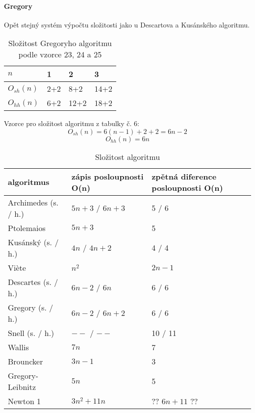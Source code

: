 \documentclass[rocnikovka]{gzwroc} %
\begin{document}
\paragraph{Gregory}
Opět stejný systém výpočtu složitosti jako u Descartova a  Kusánského algoritmu.
\begin{table}[h!]
\caption{Složitost Gregoryho algoritmu podle vzorce 23, 24 a 25}
\begin{tabular}{|l||l|l|l|}
\hline
$n$ & 1&2&3 \\ \hline
$O_{sh}(n)$&2+2&8+2&14+2 \\ \hline
$O_{hh}(n)$&6+2&12+2&18+2 \\ \hline
\end{tabular}
\end{table}
Vzorce pro složitost algoritmu z tabulky č. 6:
$$
O_{sh}(n)=6(n-1)+2+2=6n-2
$$
$$
O_{hh}(n)=6n
$$


\begin{table}[h!]
\caption{Složitost algoritmu}
\begin{tabular}{|l||l|l|}
\hline
\bfseries{algoritmus} & \bfseries{zápis posloupnosti O(n)} & \bfseries{zpětná diference posloupnosti O(n)} \\ \hline \hline
Archimedes (s. / h.) & $5n+3$ / $6n+3$      & 5 / 6   \\ \hline
Ptolemaios & $5n+3$      & 5   \\ \hline
Kusánský (s. / h.) & $4n$ / $4n+2$      & 4 / 4   \\ \hline  
Viète & $n^2$      & $2n-1$   \\ \hline
Descartes (s. / h.) & $6n-2$ / $6n$      & 6 / 6   \\ \hline
Gregory (s. / h.) & $6n-2$ / $6n+2$      & 6 / 6   \\ \hline
Snell (s. / h.) & $--$ / $--$      & 10 / 11   \\ \hline
Wallis & $7n$    & 7   \\ \hline
Brouncker & $3n-1$    & 3   \\ \hline
Gregory-Leibnitz & $5n$      & 5  \\ \hline
Newton 1 & $3n^2+11n$      & ?? $6n+11$ ??  \\ \hline
\end{tabular}
\end{table}
\end{document}
